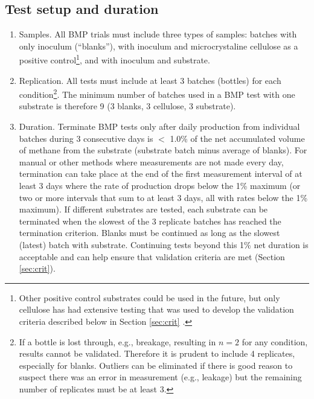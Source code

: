 \documentclass[]{article}
\begin{document}
\subsection{Test setup and duration}
\label{sec:setup}
\begin{enumerate}
  \item Samples. 
    All BMP trials must include three types of samples: batches with only inoculum (``blanks''), with inoculum and microcrystaline cellulose as a positive control\footnote{
      Other positive control substrates could be used in the future, but only cellulose has had extensive testing that was used to develop the validation criteria described below in Section \ref{sec:crit} \citep{hafnerImprovingInterlaboratoryReproducibilityInpreparation}.
    }, and with inoculum and substrate.
    \item Replication. 
    All tests must include at least 3 batches (bottles) for each condition\footnote{
      If a bottle is lost through, e.g., breakage, resulting in $n=2$ for any condition, results cannot be validated.
      Therefore it is prudent to include 4 replicates, especially for blanks.
      Outliers can be eliminated if there is good reason to suspect there was an error in measurement (e.g., leakage) but the remaining number of replicates must be at least 3.
    }.
    The minimum number of batches used in a BMP test with one substrate is therefore 9 (3 blanks, 3 cellulose, 3 substrate).
  \item Duration. 
    Terminate BMP tests only after daily  production from individual batches during 3 consecutive days is $<$ 1.0\% of the net accumulated volume of methane from the substrate (substrate batch minus average of blanks). 
    For manual or other methods where measurements are not made every day, termination can take place at the end of the first measurement interval of at least 3 days where the rate of production drops below the 1\% maximum (or two or more intervals that sum to at least 3 days, all with rates below the 1\% maximum).
    If different substrates are tested, each substrate can be terminated when the slowest of the 3 replicate batches has reached the termination criterion.
    Blanks must be continued as long as the slowest (latest) batch with substrate.
    Continuing tests beyond this 1\% net duration is acceptable and can help ensure that validation criteria are met (Section \ref{sec:crit}).
\end{enumerate}
\end{document}
